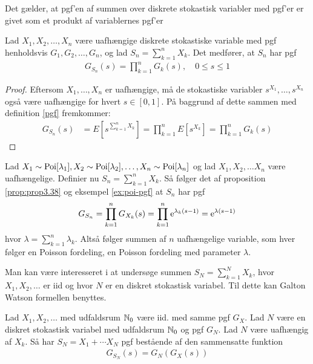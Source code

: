 Det gælder, at pgf'en af summen over diskrete stokastisk variabler med pgf'er er givet som et produkt af variablernes pgf'er
\begin{prop} \label{prop:prop3.38}%
    Lad $X_1, X_2, \ldots, X_n$ være uafhængige diskrete stokastiske variable med pgf henholdsvis $G_1, G_2, \ldots, G_n$, og lad $S_n= \sum^n_{k = 1} X_k$. Det medfører, at $S_n$ har pgf
    \begin{align*}
        G_{S_n}(s)=\prod^n_{k = 1} G_k(s), \quad 0\leq s \leq 1
    \end{align*}
\end{prop}

\begin{proof}
Eftersom $X_1, \ldots, X_n$ er uafhængige, må de stokastiske variabler $s^{X_1}, \ldots, s^{X_n} $ også være uafhængige for hvert $s\in[0,1]$. På baggrund af dette sammen med definition \ref{pgf} fremkommer:
\begin{align*}
    G_{S_n}(s) &= E[s^{\sum^n_{k = 1} X_k}] = \prod^n_{k = 1} E[s^{X_k}] = \prod^n_{k = 1} G_k(s) 
\end{align*}
\end{proof}
\begin{exmp}\label{exmp:sumAfPoissonFordeling}
Lad $X_1 \sim \textnormal{Poi}[\lambda_1], X_2 \sim \textnormal{Poi}[\lambda_2], \ldots, X_n \sim \textnormal{Poi}[\lambda_n]$ og lad $X_1, X_2, \ldots X_n$ være uafhængelige. Definier nu $S_n = \sum^n_{k = 1} X_k$. Så følger det af proposition \ref{prop:prop3.38} og eksempel \ref{ex:poi-pgf} at $S_n$ har pgf
\begin{equation*}
    G_{S_n} = \prod^n_{k = 1} G_{X_k}(s) = \prod^n_{k = 1} \mathrm{e}^{\lambda_k(s - 1)} = \mathrm{e}^{\lambda(s - 1)}
\end{equation*}
hvor $\lambda = \sum^n_{k = 1} \lambda_k$. Altså følger summen af $n$ uafhængelige variable, som hver følger en Poisson fordeling, en Poisson fordeling med parameter $\lambda$.
\end{exmp}
Man kan være interesseret i at undersøge summen $S_N = \sum^N_{k = 1} X_k$, hvor $X_1, X_2, \ldots$ er iid og hvor $N$ er en diskret stokastisk variabel. Til dette kan Galton Watson formellen benyttes.
\begin{prop}  \label{prop 3.39} %
    Lad $X_1,X_2,\ldots$ med udfaldsrum $\mathbb{N}_0$ være iid. med samme pgf $G_X$. Lad $N$ være en diskret stokastisk variabel med udfaldsrum $\mathbb{N}_0$ og pgf $G_N$. Lad $N$ være uafhængig af $X_k$. Så har $S_N=X_1+\cdots X_N$ pgf bestående af den sammensatte funktion
    \begin{align*}
        G_{S_N}(s)=G_N(G_X(s))
    \end{align*}
\end{prop}
